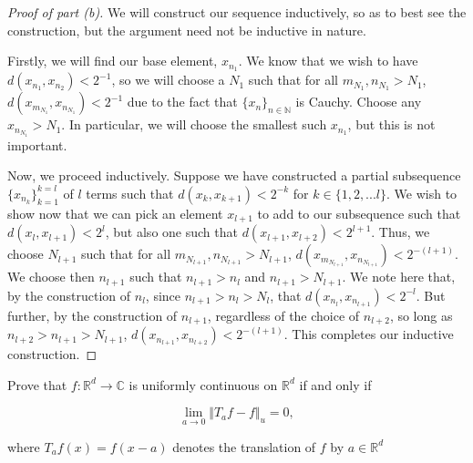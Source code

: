 \documentclass[10pt]{article}
\newenvironment{problem}[2][Problem]{\begin{trivlist}
\item[\hskip \labelsep {\bfseries #1}\hskip \labelsep {\bfseries #2.}]}{\end{trivlist}}
\begin{document}
\begin{proof}[Proof of part (b)]

We will construct our sequence inductively, so as to best see the construction, but the argument need not be inductive in nature.

Firstly, we will find our base element, $x_{n_1}$. We know that we wish to have $d(x_{n_1},x_{n_2}) < 2^{-1}$, so we will choose a $N_1$ such that for all $m_{N_1}, n_{N_1} > N_1$, $d(x_{m_{N_1}}, x_{n_{N_1}}) < 2^{-1}$ due to the fact that ${\{x_n\}_{n\in\mathbb{N}}}$ is Cauchy. Choose any $x_{n_{N_1}} > N_1$. In particular, we will choose the smallest such $x_{n_1}$, but this is not important.

Now, we proceed inductively. Suppose we have constructed a partial subsequence ${\{x_{n_k}\}_{k = 1}^{k=l}}$ of $l$ terms such that $d(x_k,x_{k+1}) < 2^{-k}$ for $k \in \{ 1,2,...l \}$. We wish to show now that we can pick an element $x_{l+1}$ to add to our subsequence such that $d(x_l,x_{l+1}) < 2^{l}$, but also one such that $d(x_{l+1},x_{l+2}) < 2^{l+1}$. Thus, we choose $N_{l+1}$ such that for all $m_{N_{l+1}}, n_{N_{l+1}} > N_{l+1}$, $d(x_{m_{N_{l+1}}}, x_{n_{ N_{l+1}}}) < 2^{-(l+1)}$. We choose then $n_{l+1}$ such that $n_{l+1} > n_l$ and $n_{l+1} > N_{l+1}$. We note here that, by the construction of $n_l$, since $n_{l+1} > n_l > N_l$, that $d(x_{n_l},x_{n_{l+1}}) < 2^{-l}$. But further, by the construction of $n_{l+1}$, regardless of the choice of $n_{l+2}$, so long as $n_{l+2} > n_{l+1} > N_{l+1}$, $d(x_{n_{l+1}},x_{n_{l+2}}) < 2^{-(l+1)}$. This completes our inductive construction.

\end{proof}

\begin{problem}{1.3.6}
Prove that $f:\mathbb{R}^d \rightarrow \mathbb{C}$ is uniformly continuous on $\mathbb{R}^d$ if and only if

$$ \lim_{a \to 0} \Vert T_a f - f \Vert_u = 0,$$

where $T_a f(x) = f(x-a)$ denotes the translation of $f$ by $a \in \mathbb{R}^d$
\end{problem}
\end{document}

